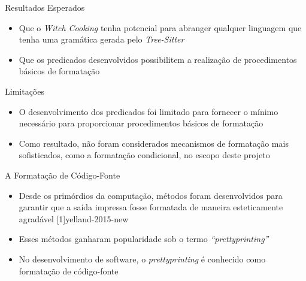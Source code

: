 \documentclass
  [ aspectratio=169,
    english,
    hyperref={citecolor=blue,colorlinks=true,linkcolor=blue,urlcolor=blue},
    brazil]
  {beamer}
\newcommand{\treesitter}{\textit{Tree-Sitter}\xspace}
\newcommand{\witchcooking}{\textit{Witch Cooking}\xspace}
\begin{document}

  \begin{frame}{Resultados Esperados}
    \begin{itemize}
      \item Que o \witchcooking tenha potencial para abranger qualquer
            linguagem que tenha uma gramática gerada pelo \treesitter
      \item Que os predicados desenvolvidos possibilitem a realização de
            procedimentos básicos de formatação
    \end{itemize}
  \end{frame}


  \begin{frame}{Limitações}
    \begin{itemize}
      \item O desenvolvimento dos predicados foi limitado para fornecer o
            mínimo necessário para proporcionar procedimentos básicos de
            formatação
      \item Como resultado, não foram considerados mecanismos de formatação
            mais sofisticados, como a formatação condicional, no escopo deste
            projeto
    \end{itemize}
  \end{frame}


  \begin{frame}{A Formatação de Código-Fonte}
    \begin{itemize}
      \item Desde os primórdios da computação, métodos foram desenvolvidos para
            garantir que a saída impressa fosse formatada de maneira
            esteticamente agradável
            [1]{yelland-2015-new}
      \item Esses métodos ganharam popularidade sob o termo
            \textit{``prettyprinting''}
      \item No desenvolvimento de software, o \textit{prettyprinting} é
            conhecido como formatação de código-fonte
    \end{itemize}
  \end{frame}
\end{document}

